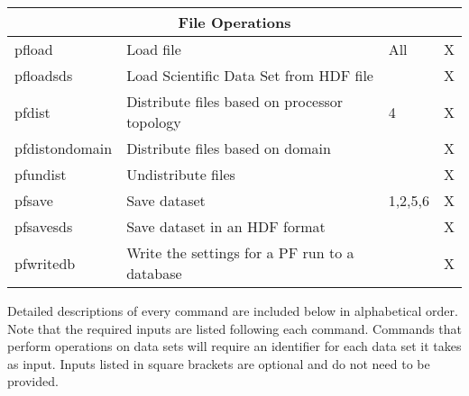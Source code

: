 {\begin{table}
\begin{tabular}{ | p{3cm} | p{6cm} | p{2cm} | p{3cm} | }
	\multicolumn{4}{|c|}{File Operations}  \\ \hline
	pfload & Load file & All & X \\ \hline
	pfloadsds & Load Scientific Data Set from HDF file &  & X \\ \hline
	pfdist & Distribute files  based on processor topology & 4 & X \\ \hline
	pfdistondomain & Distribute files based on domain &  & X \\ \hline
	pfundist & Undistribute files &  & X  \\ \hline
	pfsave & Save dataset & 1,2,5,6 & X \\ \hline
	pfsavesds & Save dataset in an HDF format &  & X \\ \hline
	pfwritedb & Write the settings for a PF run to a database &  & X  \\ \hline
\end{tabular}
\label{pftools3}
\end{table}
}
\clearpage

Detailed descriptions of every command are included below in alphabetical order.
Note that the required inputs are listed following each command. Commands that perform 
operations on data sets will require an identifier for each data set it takes as input. 
Inputs listed in square brackets are optional and do not need to be provided. 

